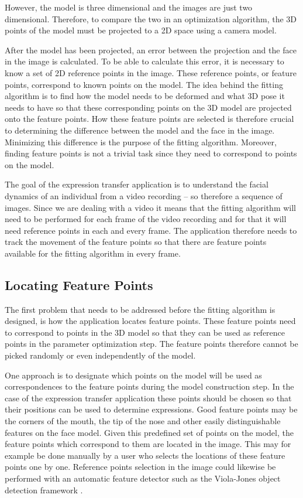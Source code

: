 \documentclass[11pt,a4paper]{report}
\begin{document}
However, the model is three dimensional and the images are just two dimensional. Therefore, to compare the two in an optimization algorithm, the 3D points
of the model must be projected to a 2D space using a camera model.

After the model has been projected, an error between the projection and the face
in the image is calculated. To be able to calculate this error, it is necessary
to know a set of 2D reference points in the image. These reference points, or feature
points, correspond to known points on the model. The idea behind the
fitting algorithm is to find how the model needs to be deformed and what 3D pose
it needs to have so that these corresponding points on the 3D model are
projected onto the feature points. How these feature points are selected is therefore crucial to
determining the difference between the model and the face in the image. Minimizing this
difference is the purpose of the fitting algorithm. Moreover, finding feature points is
not a trivial task since they need to correspond to points on the model.

The goal of the expression transfer application is to understand the facial
dynamics of an individual from a video recording -- so therefore a sequence of images. Since we are dealing with a
video it means that the fitting algorithm will need to be performed for
each frame of the video recording and for that it will need reference points
in each and every frame. The application therefore needs to track the movement
of the feature points so that there are feature points available for the fitting
algorithm in every frame.

\subsection{Locating Feature Points}
The first problem that needs to be addressed before the fitting algorithm is
designed, is how the application locates feature points. These feature points
need to correspond to points in the 3D model so that they can be used as
reference points in the parameter optimization step. The feature points
therefore cannot be picked randomly or even independently of the model.

One approach is to designate which points on
the model will be used as correspondences to the feature points during the model construction
step. In the case of the expression transfer application these points should be chosen
so that their positions can be used to determine expressions. Good feature points may
be the corners of the mouth, the tip of the nose and other easily
distinguishable features on the face model. Given this predefined set of points
on the model, the feature points which correspond to them are located in the
image. This may for example be done manually by a user who selects the locations of
these feature points one by one. Reference points selection in the image could likewise be performed with an automatic
feature detector such as the Viola-Jones object detection framework \cite{viola}.
\end{document}
